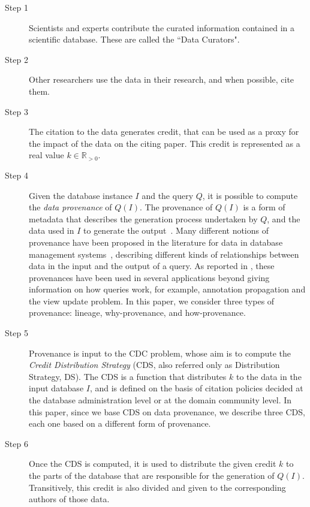 \begin{description}
	\item[Step 1] Scientists and experts contribute 
	the curated information contained in a scientific database.  These are called the ``Data Curators".  
	\item[Step 2] Other researchers use the data in their research, and when possible, cite them. 
	\item[Step 3] The citation to the data generates credit, that can be used as a proxy for the impact of the data on the citing paper. This credit is represented as a real value $k \in \mathbb{R}_{>0}$. 
	\item[Step 4] Given the database instance $I$ and the query $Q$, it is possible to compute the \emph{data provenance} of $Q(I)$. The provenance of $Q(I)$ is a form of metadata that describes the generation process undertaken by $Q$, and the data used in $I$ to generate the output~\citep{CheneyProvSurvey}. Many different notions of provenance have been proposed in the literature for data in database management systems~\citep{lineageCui, WhyProvBuneman, howProvenanceGreen}, describing different kinds of relationships between data in the input and the output of a query. As reported in \citep{CheneyProvSurvey}, these provenances have been used in several applications beyond giving information on how queries work, for example, annotation propagation and the view update problem. In this paper, we consider three types of provenance: lineage, why-provenance, and how-provenance. %
	\item[Step 5] Provenance is input to the CDC problem, whose aim is to compute the \emph{Credit Distribution Strategy} (CDS, also referred only as Distribution Strategy, DS). The CDS is a function that distributes $k$ to the data in the input database $I$, and is defined on the basis of citation policies decided at the database administration level or at the domain community level.
	In this paper, since we base CDS on data provenance, we describe three CDS, each one based on a different form of provenance.
	\item[Step 6] Once the CDS is computed, it is used to distribute the given credit $k$ to the parts of the database that are responsible for the generation of $Q(I)$. Transitively, this credit is also divided and given to the corresponding authors of those data.
\end{description}

